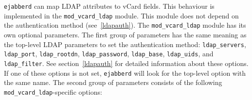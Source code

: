 \documentclass[a4paper,10pt]{book}
\newcommand{\option}[1]{\texttt{#1}}
\newcommand{\ejabberd}{\texttt{ejabberd}}
\newcommand{\module}[1]{\texttt{#1}}
\newcommand{\modvcardldap}{\module{mod\_vcard\_ldap}}
\begin{document}

\ejabberd{} can map LDAP attributes to vCard fields. This behaviour is
implemented in the \modvcardldap{} module. This module does not depend on the
authentication method (see~\ref{ldapauth}). The \modvcardldap{} module has
its own optional parameters. The first group of parameters has the same
meaning as the top-level LDAP parameters to set the authentication method:
\option{ldap\_servers}, \option{ldap\_port}, \option{ldap\_rootdn},
\option{ldap\_password}, \option{ldap\_base}, \option{ldap\_uids}, and
\option{ldap\_filter}. See section~\ref{ldapauth} for detailed information
about these options. If one of these options is not set, \ejabberd{} will look
for the top-level option with the same name. The second group of parameters
consists of the following \modvcardldap{}-specific options:
\end{document}
